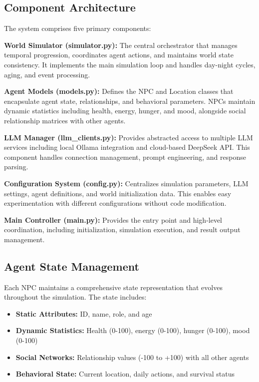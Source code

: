 \documentclass[conference]{IEEEtran}
\begin{document}
\subsection{Component Architecture}

The system comprises five primary components:

\textbf{World Simulator (simulator.py):} The central orchestrator that manages temporal progression, coordinates agent actions, and maintains world state consistency. It implements the main simulation loop and handles day-night cycles, aging, and event processing.

\textbf{Agent Models (models.py):} Defines the NPC and Location classes that encapsulate agent state, relationships, and behavioral parameters. NPCs maintain dynamic statistics including health, energy, hunger, and mood, alongside social relationship matrices with other agents.

\textbf{LLM Manager (llm\_clients.py):} Provides abstracted access to multiple LLM services including local Ollama integration and cloud-based DeepSeek API. This component handles connection management, prompt engineering, and response parsing.

\textbf{Configuration System (config.py):} Centralizes simulation parameters, LLM settings, agent definitions, and world initialization data. This enables easy experimentation with different configurations without code modification.

\textbf{Main Controller (main.py):} Provides the entry point and high-level coordination, including initialization, simulation execution, and result output management.

\subsection{Agent State Management}

Each NPC maintains a comprehensive state representation that evolves throughout the simulation. The state includes:

\begin{itemize}
\item \textbf{Static Attributes:} ID, name, role, and age
\item \textbf{Dynamic Statistics:} Health (0-100), energy (0-100), hunger (0-100), mood (0-100)
\item \textbf{Social Networks:} Relationship values (-100 to +100) with all other agents
\item \textbf{Behavioral State:} Current location, daily actions, and survival status
\end{itemize}
\end{document}
